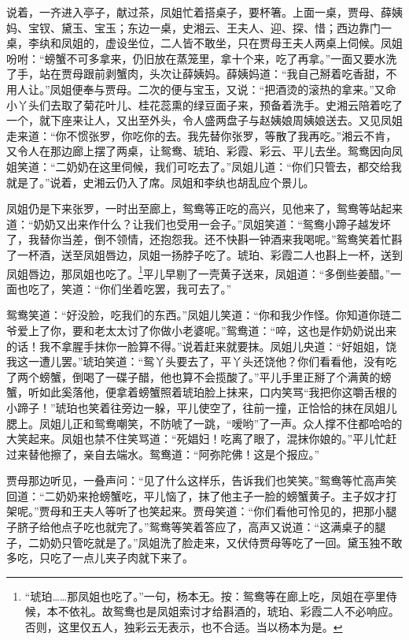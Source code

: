 说着，一齐进入亭子，献过茶，凤姐忙着搭桌子，要杯箸。上面一桌，贾母、薛姨妈、宝钗、黛玉、宝玉；东边一桌，史湘云、王夫人、迎、探、惜；西边靠门一桌，李纨和凤姐的，虚设坐位，二人皆不敢坐，只在贾母王夫人两桌上伺候。凤姐吩咐：“螃蟹不可多拿来，仍旧放在蒸笼里，拿十个来，吃了再拿。”一面又要水洗了手，站在贾母跟前剥蟹肉，头次让薛姨妈。薛姨妈道：“我自己掰着吃香甜，不用人让。”凤姐便奉与贾母。二次的便与宝玉，又说：“把酒烫的滚热的拿来。”又命小丫头们去取了菊花叶儿、桂花蕊熏的绿豆面子来，预备着洗手。史湘云陪着吃了一个，就下座来让人，又出至外头，令人盛两盘子与赵姨娘周姨娘送去。又见凤姐走来道：“你不惯张罗，你吃你的去。我先替你张罗，等散了我再吃。”湘云不肯，又令人在那边廊上摆了两桌，让鸳鸯、琥珀、彩霞、彩云、平儿去坐。鸳鸯因向凤姐笑道：“二奶奶在这里伺候，我们可吃去了。”凤姐儿道：“你们只管去，都交给我就是了。”说着，史湘云仍入了席。凤姐和李纨也胡乱应个景儿。

凤姐仍是下来张罗，一时出至廊上，鸳鸯等正吃的高兴，见他来了，鸳鸯等站起来道：“奶奶又出来作什么？让我们也受用一会子。”凤姐笑道：“鸳鸯小蹄子越发坏了，我替你当差，倒不领情，还抱怨我。还不快斟一钟酒来我喝呢。”鸳鸯笑着忙斟了一杯酒，送至凤姐唇边，凤姐一扬脖子吃了。琥珀、彩霞二人也斟上一杯，送到凤姐唇边，那凤姐也吃了。\footnote{“琥珀\ldots{}\ldots{}那凤姐也吃了。”一句，杨本无。按：鸳鸯等在廊上吃，凤姐在亭里侍候，本不依礼。故鸳鸯也是凤姐索讨才给斟酒的，琥珀、彩霞二人不必响应。否则，这里仅五人，独彩云无表示，也不合适。当以杨本为是。}平儿早剔了一壳黄子送来，凤姐道：“多倒些姜醋。”一面也吃了，笑道：“你们坐着吃罢，我可去了。”

鸳鸯笑道：“好没脸，吃我们的东西。”凤姐儿笑道：“你和我少作怪。你知道你琏二爷爱上了你，要和老太太讨了你做小老婆呢。”鸳鸯道：“啐，这也是作奶奶说出来的话！我不拿腥手抹你一脸算不得。”说着赶来就要抹。凤姐儿央道：“好姐姐，饶我这一遭儿罢。”琥珀笑道：“鸳丫头要去了，平丫头还饶他？你们看看他，没有吃了两个螃蟹，倒喝了一碟子醋，他也算不会揽酸了。”平儿手里正掰了个满黄的螃蟹，听如此奚落他，便拿着螃蟹照着琥珀脸上抹来，口内笑骂“我把你这嚼舌根的小蹄子！”琥珀也笑着往旁边一躲，平儿使空了，往前一撞，正恰恰的抹在凤姐儿腮上。凤姐儿正和鸳鸯嘲笑，不防唬了一跳，“嗳哟”了一声。众人撑不住都哈哈的大笑起来。凤姐也禁不住笑骂道：“死娼妇！吃离了眼了，混抹你娘的。”平儿忙赶过来替他擦了，亲自去端水。鸳鸯道：“阿弥陀佛！这是个报应。”

贾母那边听见，一叠声问：“见了什么这样乐，告诉我们也笑笑。”鸳鸯等忙高声笑回道：“二奶奶来抢螃蟹吃，平儿恼了，抹了他主子一脸的螃蟹黄子。主子奴才打架呢。”贾母和王夫人等听了也笑起来。贾母笑道：“你们看他可怜见的，把那小腿子脐子给他点子吃也就完了。”鸳鸯等笑着答应了，高声又说道：“这满桌子的腿子，二奶奶只管吃就是了。”凤姐洗了脸走来，又伏侍贾母等吃了一回。黛玉独不敢多吃，只吃了一点儿夹子肉就下来了。

